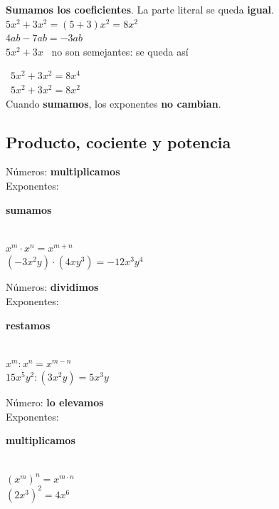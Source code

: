 \documentclass[11pt,a4paper]{article}
\newcommand{\comic}{\fontfamily{ComicNeue-TLF}\selectfont}
\newcommand{\notab}[1]{{\comic\small\color{fmblue}#1}}
\newcommand{\be}[1]{{\color{fmok}\faCheckCircle}\ \ensuremath{#1}}
\newcommand{\mal}[1]{{\color{fmR}\faTimesCircle}\ {\color{fmR}\ensuremath{#1}}}
\newcommand{\fmkey}[1]{\colorbox{fmyellow!55}{\strut #1}}
\begin{document}
\vfill
\begin{minipage}[t]{0.52\linewidth}
\begin{idea}
\textbf{Sumamos los coeficientes}. La parte literal se queda \textbf{igual}.\\[4pt]
$5x^2+3x^2=(5+3)x^2=8x^2$\\[2pt]
$4ab-7ab=-3ab$\\[2pt]
$5x^2+3x$ \ \notab{no son semejantes: se queda así}
\end{idea}
\end{minipage}\hfill
\begin{minipage}[t]{0.45\linewidth}
\begin{compte}
\mal{5x^2+3x^2=8x^4}\\[3pt]
\be{5x^2+3x^2=8x^2}\\[3pt]
Cuando \textbf{sumamos}, los exponentes \textbf{no cambian}.
\end{compte}
\end{minipage}

\vfill
\subsection{Producto, cociente y potencia}
\begin{tcbraster}[raster columns=3,raster equal height,raster column skip=8pt]
\begin{tcolorbox}[fmbase,colback=fmdefbg,colframe=fmdef,coltitle=white,title={\faTimes\ \ Producto},before upper=\centering]
Números: \textbf{multiplicamos}\\ Exponentes: \fmkey{\textbf{sumamos}}\\[3pt]
{\large$x^m\cdot x^n=x^{m+n}$}\\[4pt]
$(-3x^2y)\cdot(4xy^3)=-12x^3y^4$
\end{tcolorbox}
\begin{tcolorbox}[fmbase,colback=fmdefbg,colframe=fmdef,coltitle=white,title={\faDivide\ \ Cociente},before upper=\centering]
Números: \textbf{dividimos}\\ Exponentes: \fmkey{\textbf{restamos}}\\[3pt]
{\large$x^m:x^n=x^{m-n}$}\\[4pt]
$15x^5y^2:(3x^2y)=5x^3y$
\end{tcolorbox}
\begin{tcolorbox}[fmbase,colback=fmdefbg,colframe=fmdef,coltitle=white,title={\faSuperscript\ \ Potencia},before upper=\centering]
Número: \textbf{lo elevamos}\\ Exponentes: \fmkey{\textbf{multiplicamos}}\\[3pt]
{\large$(x^m)^n=x^{m\cdot n}$}\\[4pt]
$(2x^3)^2=4x^6$
\end{tcolorbox}
\end{tcbraster}
\end{document}
